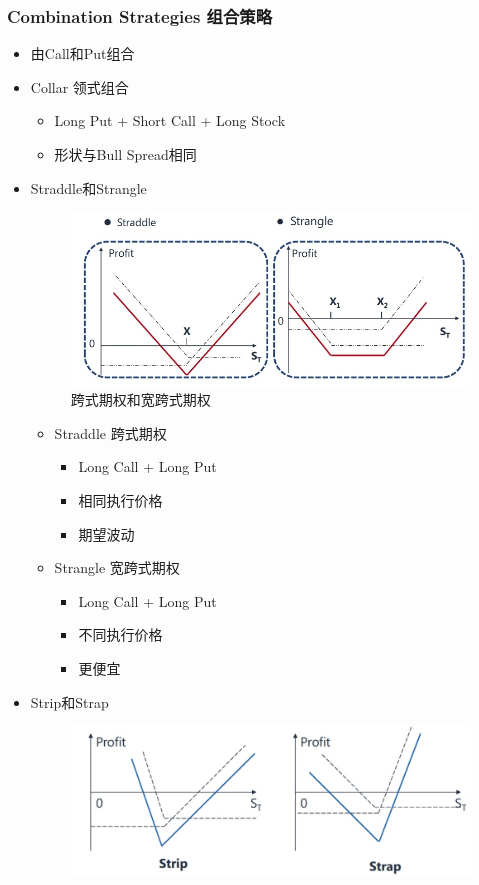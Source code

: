 \documentclass[a4paper,6pt,twoside,openany]{article}
\begin{document}
\subsubsection{Combination Strategies 组合策略}
\begin{itemize}
\item 由Call和Put组合
\item Collar 领式组合
  \begin{itemize}
  \item Long Put + Short Call + Long Stock
  \item 形状与Bull Spread相同
  \end{itemize}
\item Straddle和Strangle
  \begin{figure}[!htbp]
    \centering \includegraphics[width=150mm]{Strategy_Straddle_Strangle.jpg}
    \caption{跨式期权和宽跨式期权}
  \end{figure}
  \begin{itemize}
  \item Straddle 跨式期权
    \begin{itemize}
    \item Long Call + Long Put
    \item 相同执行价格
    \item 期望波动
    \end{itemize}
  \item Strangle 宽跨式期权
    \begin{itemize}
    \item Long Call + Long Put
    \item 不同执行价格
    \item 更便宜
    \end{itemize}
  \end{itemize}
\item Strip和Strap
  \begin{figure}[!htbp]
    \centering \includegraphics[width=150mm]{Strategy_Strip_Strap.jpg}

\end{figure}
\end{itemize}
\end{document}
